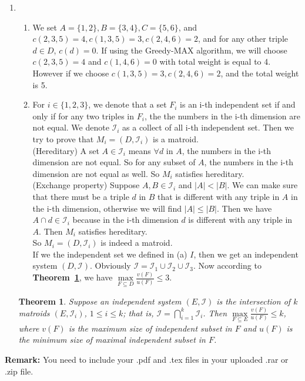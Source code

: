 \documentclass[12pt,a4paper]{article}
\makeatletter
\newtheorem{theorem}{Theorem}
\newtheorem*{solution}{Solution}
\theoremstyle{definition}
\renewenvironment{solution}[1][Solution] {\par\pushQED{\qed}\normalfont\topsep6\p@\@plus6\p@\relax\trivlist\item[\hskip\labelsep\bfseries#1\@addpunct{.}]\ignorespaces}{\popQED\endtrivlist\@endpefalse} \makeatother
\makeatother
\begin{document}
\begin{enumerate}
\begin{solution}
\begin{enumerate}
        \item We set $A=\{1,2\}, B=\{3,4\} ,C = \{5,6\}$, and $c(2,3,5) = 4, c(1,3,5) = 3, c(2,4,6) = 2$, and for any other triple $d\in D$, $c(d) = 0$. If using the Greedy-MAX algorithm, we will choose $c(2,3,5) = 4$ and $c(1,4,6) = 0$ with total weight is equal to 4. However if we choose $c(1,3,5) = 3, c(2,4,6) = 2$, and the total weight is 5.
        \item For $i \in \{1,2,3\} $, we denote that a set ${F_i}$ is an i-th independent set if and only if for any two triples in ${F_i}$, the the numbers in the i-th dimension are not equal. We denote $\mathcal{I}_{i}$ as a collect of all i-th independent set. Then we try to prove that $M_i = (D,\mathcal{I}_{i})$ is a matroid. \\
        
         (Hereditary) A set $A \in \mathcal{I}_{i}$ means $\forall d$ in $A$, the numbers in the i-th dimension are not equal. So for any subset of $A$, the numbers in the i-th dimension are not equal as well. So $M_i$ satisfies hereditary.\\
         
         (Exchange property) Suppose $A,B \in \mathcal{I}_{i}$ and $|A| < |B|$. We can make sure that there must be a triple $d$ in $B$ that is different with any triple in $A$ in the i-th dimension, otherwise we will find $|A| \leqslant |B|$. Then we have $A \cap {d} \in \mathcal{I}_i$ because in the i-th dimension $d$ is different with any triple in $A$. Then $M_i$ satisfies hereditary.\\
         
         So  $M_i = (D,\mathcal{I}_{i})$ is indeed a matroid.\\
         
         If we the independent set we defined in (a) $I$, then we get an independent system $(D, \mathcal{I})$. Obviously $\mathcal{I} = \mathcal{I}_{1} \cup \mathcal{I}_{2} \cup \mathcal{I}_{3}$. Now according to \textbf{Theorem~\ref{Thm-Intersect}}, we have $\max\limits_{F \subseteq D} \frac{v(F)}{u(F)} \leq 3$.
         
    	        \end{enumerate}
    	    \end{solution}
    
    \begin{theorem} \label{Thm-Intersect}
        Suppose an independent system $(E, \mathcal{I})$ is the intersection of $k$ matroids $\left(E, \mathcal{I}_{i}\right)$, $1 \leq i \leq k$; that is, $\mathcal{I}=\bigcap_{i=1}^{k} \mathcal{I}_{i}$. Then $\max\limits_{F \subseteq E} \frac{v(F)}{u(F)} \leq k$, where $v(F)$ is the maximum size of independent subset in $F$ and $u(F)$ is the minimum size of maximal independent subset in $F$.
    \end{theorem}    
\end{enumerate}

\vspace{20pt}

\textbf{Remark:} You need to include your .pdf and .tex files in your uploaded .rar or .zip file.

\end{document}
